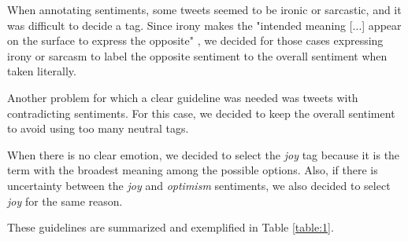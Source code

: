 \documentclass[11pt,a4paper]{article}
\begin{document}
When annotating sentiments, some tweets seemed to be ironic or sarcastic, and it was difficult to decide a tag. Since irony makes the "intended meaning [...] appear on the surface to express the opposite" \cite{OUP2022}, we decided for those cases expressing irony or sarcasm to label the opposite sentiment to the overall sentiment when taken literally. 

Another problem for which a clear guideline was needed was tweets with contradicting sentiments. For this case, we decided to keep the overall sentiment to avoid using too many neutral tags.

When there is no clear emotion, we decided to select the \textit{joy} tag because it is the term with the broadest meaning among the possible options. Also, if there is uncertainty between the \textit{joy} and \textit{optimism} sentiments, we also decided to select \textit{joy} for the same reason.

These guidelines are summarized and exemplified in Table \ref{table:1}.
\end{document}
